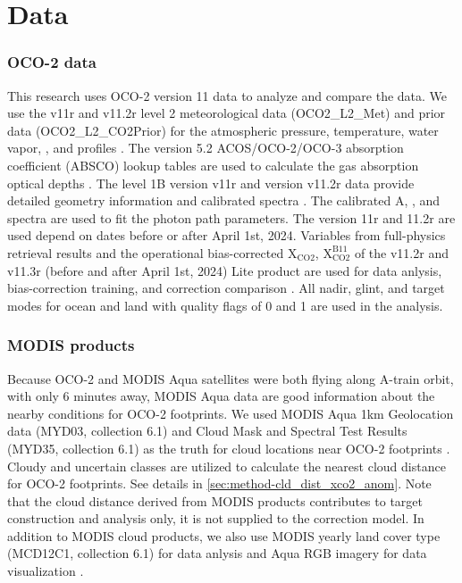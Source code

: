\section{Data}
\label{sec:data}

\subsubsection*{OCO-2 data}
This research uses OCO-2 version 11 data to analyze and compare the data. We use the v11r and v11.2r level 2 meteorological data (OCO2\_L2\_Met) and  prior data (OCO2\_L2\_CO2Prior) for the atmospheric pressure, temperature, water vapor, , and  profiles \citep{oco2_l2_co2prior_11r, oco2_l2_co2prior_112r, oco2_l2_met_11r, oco2_l2_met_112r}. The version 5.2 ACOS/OCO-2/OCO-3 absorption coefficient (ABSCO) lookup  tables are used to calculate the gas absorption optical depths \citep{oco2_absco_tables_v52}. The level 1B version v11r and version v11.2r data provide detailed geometry information and calibrated spectra \citep{oco2_l1b_science_11r, oco2_l1b_science_112r}. The calibrated A, , and  spectra are used to fit the photon path parameters. The version 11r and 11.2r are used depend on dates before or after April 1st, 2024. Variables from full-physics retrieval results and the operational bias-corrected $\mathrm{X_{CO2}}$, $\mathrm{X_{CO2}^{B11}}$ of the v11.2r and v11.3r (before and after April 1st, 2024) Lite product are used for data anlysis, bias-correction training, and correction comparison \citep{oco2_l2_lite_fp_112r, oco2_l2_lite_fp_113r}. All nadir, glint, and target modes for ocean and land with quality flags of 0 and 1 are used in the analysis. 



\subsubsection*{MODIS products}
Because OCO-2 and MODIS Aqua satellites were both flying along A-train orbit, with only 6 minutes away, MODIS Aqua data are good information about the nearby conditions for OCO-2 footprints. We used MODIS Aqua 1km Geolocation data (MYD03, collection 6.1) and Cloud Mask and Spectral Test Results (MYD35, collection 6.1) as the truth for cloud locations near OCO-2 footprints \citep{myd03_061, myd35_l2_061}. Cloudy and uncertain classes are utilized to calculate the nearest cloud distance for OCO-2 footprints. See details in \ref{sec:method-cld_dist_xco2_anom}. Note that the cloud distance derived from MODIS products contributes to target construction and analysis only, it is not supplied to the correction model. In addition to MODIS cloud products, we also use MODIS yearly land cover type (MCD12C1, collection 6.1) for data anlysis and Aqua RGB imagery for data visualization \citep{friedl2022mcd12c1_v061}.


